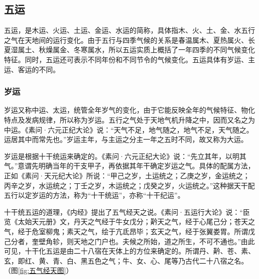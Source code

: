 \documentclass[12pt]{ctexbook}
\begin{document}
\subsection{五运}%

五运，是木运、火运、土运、金运、水运的简称，具体指木、火、土、金、水五行之气在天地间的运行变化。由于五行与四季气候的关系是春温属木、夏热属火、长夏湿属土、秋燥属金、冬寒属水，所以五运实质上概括了一年四季的不同气候变化特征。同时，五运还可表示不同年份和不同节令的气候变化。五运具体有岁运、主运、客运的不同。

\subsubsection{岁运}%

岁运又称中运、太运，统管全年岁气的变化，由于它能反映全年的气候特征、物化特点及发病规律，所以称为岁运。五行之气处于天地气机升降之中，因而又名之为中运。《素问·六元正纪大论》说：“天气不足，地气随之，地气不足，天气随之。运居其中而常先也。”岁运主年，与主运之分主一年之五时不同，故又称为大运。

岁运是根据十干统运来确定的。《素问·六元正纪大论》说：“先立其年，以明其气。”意谓先明确当年的干支甲子，再依据其年干确定岁运之气。具体的配属方法，正如《素问·天元纪大论》所说：“甲己之岁，土运统之；乙庚之岁，金运统之；丙辛之岁，水运统之；丁壬之岁，木运统之；戊癸之岁，火运统之。”这种据天干配五行以定岁运的方法，称为“十干统运”，亦称“十干纪运”。

十干统五运的道理，《内经》提出了五气经天之说。《素问·五运行大论》说：“臣览《太始天元册》文，丹天之气经于牛女戊分；黅天之气，经于心尾己分；苍天之气，经于危室柳鬼；素天之气，绘于亢氐昂毕；玄天之气，经于张翼娄胃。所谓戊己分者，奎壁角轸，则天地之门户也。夫候之所始，道之所生，不可不通也。”由此可见，十干化五运是由二十八宿在天体上的方位来确定的。所谓丹、黅、苍、素、玄，即红、黄、青、白、黑五色之气；牛、女、心、尾等乃古代二十八宿之名。（图\ref{fig:五气经天图}）

\end{document}
